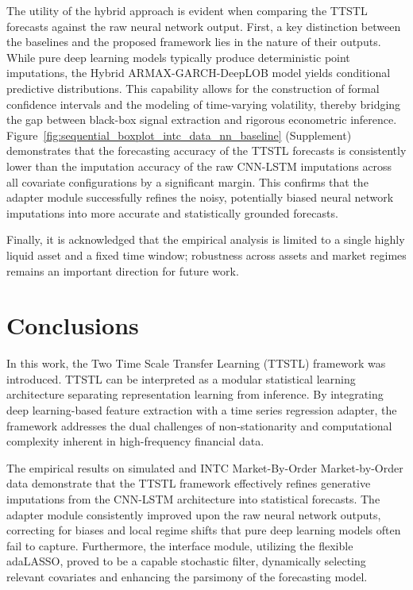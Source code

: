 \documentclass[10pt,a4paper,oneside]{article}
\providecommand{\DIFaddtex}[1]{{\protect\color{blue} \sf #1}} %
\providecommand{\DIFdeltex}[1]{{\protect\color{red} \scriptsize #1}} %
\providecommand{\DIFaddbegin}{} %
\providecommand{\DIFaddend}{} %
\providecommand{\DIFdelbegin}{} %
\providecommand{\DIFdelend}{} %
\providecommand{\DIFadd}[1]{\texorpdfstring{\DIFaddtex{#1}}{#1}} %
\providecommand{\DIFdel}[1]{\texorpdfstring{\DIFdeltex{#1}}{}} %
\newcommand{\DIFscaledelfig}{0.5}
\newlength{\DIFdelgraphicswidth} %
\newlength{\DIFdelgraphicsheight} %
\newcommand{\DIFaddincludegraphics}[2][]{{\color{blue}\fbox{\DIFOincludegraphics[#1]{#2}}}} %
\newcommand{\DIFdelincludegraphics}[2][]{%
\sbox{\DIFdelgraphicsbox}{\DIFOincludegraphics[#1]{#2}}%
\settoboxwidth{\DIFdelgraphicswidth}{\DIFdelgraphicsbox} %
\settoboxtotalheight{\DIFdelgraphicsheight}{\DIFdelgraphicsbox} %
\scalebox{\DIFscaledelfig}{%
\parbox[b]{\DIFdelgraphicswidth}{\usebox{\DIFdelgraphicsbox}\\[-\baselineskip] \rule{\DIFdelgraphicswidth}{0em}}\llap{\resizebox{\DIFdelgraphicswidth}{\DIFdelgraphicsheight}{%
\setlength{\unitlength}{\DIFdelgraphicswidth}%
\begin{picture}(1,1)%
\thicklines\linethickness{2pt} %
{\color[rgb]{1,0,0}\put(0,0){\framebox(1,1){}}}%
{\color[rgb]{1,0,0}\put(0,0){\line( 1,1){1}}}%
{\color[rgb]{1,0,0}\put(0,1){\line(1,-1){1}}}%
\end{picture}%
}\hspace*{3pt}}} %
} %
\DeclareRobustCommand{\DIFaddbegin}{\DIFOaddbegin \let\includegraphics\DIFaddincludegraphics} %
\DeclareRobustCommand{\DIFaddend}{\DIFOaddend \let\includegraphics\DIFOincludegraphics} %
\DeclareRobustCommand{\DIFdelbegin}{\DIFOdelbegin \let\includegraphics\DIFdelincludegraphics} %
\DeclareRobustCommand{\DIFdelend}{\DIFOaddend \let\includegraphics\DIFOincludegraphics} %
\begin{document}
The utility of the hybrid approach is evident when comparing the TTSTL forecasts against the raw neural network output. First, a key distinction between the baselines and the proposed framework lies in the nature of their outputs. While pure deep learning models typically produce deterministic point imputations, the Hybrid ARMAX-GARCH-DeepLOB model yields conditional predictive distributions. This capability allows for the construction of formal confidence intervals and the modeling of time-varying volatility, thereby bridging the gap between black-box signal extraction and rigorous econometric inference. Figure~\ref{fig:sequential_boxplot_intc_data_nn_baseline} (Supplement) demonstrates that the forecasting accuracy of the TTSTL forecasts is consistently lower than the imputation accuracy of the raw CNN-LSTM imputations across all covariate configurations by a significant margin. This confirms that the adapter module successfully refines the noisy, potentially biased neural network imputations into more accurate and statistically grounded forecasts.

Finally, it is acknowledged that the empirical analysis is limited to a single highly liquid asset and a fixed time window; robustness across assets and market regimes remains an important direction for future work.

\section{Conclusions}
\label{Sect:Conclusions}

In this work, the Two Time Scale Transfer Learning (TTSTL) framework was introduced. TTSTL can be interpreted as a modular statistical learning architecture separating representation learning from inference. By integrating deep learning-based feature extraction with a time series regression adapter, the framework addresses the dual challenges of non-stationarity and computational complexity inherent in high-frequency financial data.

The empirical results on simulated and INTC \DIFdelbegin \DIFdel{Market-By-Order }\DIFdelend \DIFaddbegin \DIFadd{Market-by-Order }\DIFaddend data demonstrate that the TTSTL framework effectively refines generative imputations from the CNN-LSTM architecture into statistical forecasts. The adapter module consistently improved upon the raw neural network outputs, correcting for biases and local regime shifts that pure deep learning models often fail to capture. Furthermore, the interface module, utilizing the flexible adaLASSO, proved to be a capable stochastic filter, dynamically selecting relevant covariates and enhancing the parsimony of the forecasting model.
\end{document}
